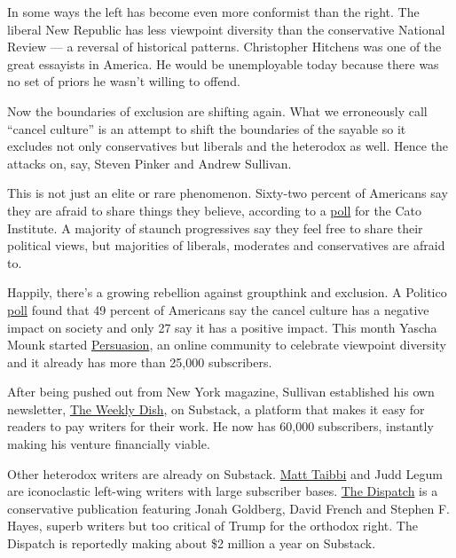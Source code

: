 In some ways the left has become even more conformist than the right.
The liberal New Republic has less viewpoint diversity than the
conservative National Review --- a reversal of historical patterns.
Christopher Hitchens was one of the great essayists in America. He would
be unemployable today because there was no set of priors he wasn't
willing to offend.

Now the boundaries of exclusion are shifting again. What we erroneously
call ``cancel culture'' is an attempt to shift the boundaries of the
sayable so it excludes not only conservatives but liberals and the
heterodox as well. Hence the attacks on, say, Steven Pinker and Andrew
Sullivan.

This is not just an elite or rare phenomenon. Sixty-two percent of
Americans say they are afraid to share things they believe, according to
a
\href{https://www.cato.org/publications/survey-reports/poll-62-americans-say-they-have-political-views-theyre-afraid-share\#_blank}{poll}
for the Cato Institute. A majority of staunch progressives say they feel
free to share their political views, but majorities of liberals,
moderates and conservatives are afraid to.

Happily, there's a growing rebellion against groupthink and exclusion. A
Politico
\href{https://www.politico.com/news/2020/07/22/americans-cancel-culture-377412}{poll}
found that 49 percent of Americans say the cancel culture has a negative
impact on society and only 27 say it has a positive impact. This month
Yascha Mounk started
\href{https://www.persuasion.community/}{Persuasion}, an online
community to celebrate viewpoint diversity and it already has more than
25,000 subscribers.

After being pushed out from New York magazine, Sullivan established his
own newsletter, \href{https://andrewsullivan.substack.com/subscribe}{The
Weekly Dish}, on Substack, a platform that makes it easy for readers to
pay writers for their work. He now has 60,000 subscribers, instantly
making his venture financially viable.

Other heterodox writers are already on Substack.
\href{https://taibbi.substack.com/}{Matt Taibbi} and Judd Legum are
iconoclastic left-wing writers with large subscriber bases.
\href{https://thedispatch.com/}{The Dispatch} is a conservative
publication featuring Jonah Goldberg, David French and Stephen F. Hayes,
superb writers but too critical of Trump for the orthodox right. The
Dispatch is reportedly making about \$2 million a year on Substack.

